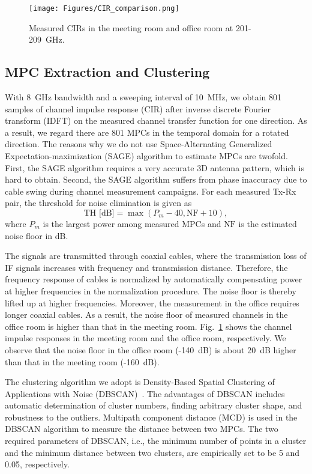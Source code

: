 \documentclass[journal,12pt,draftclsnofoot,onecolumn]{IEEEtran}
\begin{document}
\begin{figure}
\centering
\texttt{[image: Figures/CIR\_comparison.png]}
\caption{Measured CIRs in the meeting room and office room at 201-209~GHz.}
\label{fig:CIR}
\end{figure}

\subsection{MPC Extraction and Clustering}
With 8~GHz bandwidth and a sweeping interval of 10~MHz, we obtain 801 samples of channel impulse response (CIR) after inverse discrete Fourier transform (IDFT) on the measured channel transfer function for one direction. As a result, we regard there are 801 MPCs in the temporal domain for a rotated direction. The reasons why we do not use Space-Alternating Generalized Expectation-maximization (SAGE) algorithm to estimate MPCs are twofold. First, the SAGE algorithm requires a very accurate 3D antenna pattern, which is hard to obtain. Second, the SAGE algorithm suffers from phase inaccuracy due to cable swing during channel measurement campaigns. For each measured Tx-Rx pair, the threshold for noise elimination is given as
\begin{equation}
    \text{TH} \text{ [dB]}=\max(P_m-40,\text{NF}+10),
\end{equation}
where $P_m$ is the largest power among measured MPCs and $\text{NF}$ is the estimated noise floor in dB.
\par The signals are transmitted through coaxial cables, where the transmission loss of IF signals increases with frequency and transmission distance. Therefore, the frequency response of cables is normalized by automatically compensating power at higher frequencies in the normalization procedure. The noise floor is thereby lifted up at higher frequencies. Moreover, the measurement in the office requires longer coaxial cables. As a result, the noise floor of measured channels in the office room is higher than that in the meeting room. Fig.~\ref{fig:CIR} shows the channel impulse responses in the meeting room and the office room, respectively. We observe that the noise floor in the office room (-140~dB) is about 20~dB higher than that in the meeting room (-160~dB).
\par The clustering algorithm we adopt is Density-Based
Spatial Clustering of Applications with Noise (DBSCAN)~\cite{chen2021channel}. The advantages of DBSCAN includes automatic determination of cluster numbers, finding arbitrary cluster shape, and robustness to the outliers. Multipath component distance (MCD) is used in the DBSCAN algorithm to measure the distance between two MPCs. The two required parameters of DBSCAN, i.e., the minimum number of points in a cluster and the minimum distance between two clusters, are empirically set to be 5 and 0.05, respectively.
\end{document}
